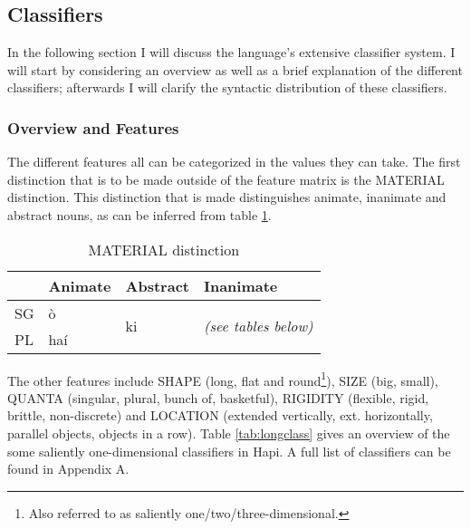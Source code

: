 \documentclass[a4paper, 12pt, oneside]{memoir}
\begin{document}
\subsection{Classifiers}\label{sclassifier}
In the following section I will discuss the language's extensive classifier system. I will start by considering an overview as well as a brief explanation of the different classifiers; afterwards I will clarify the syntactic distribution of these classifiers. 
\subsubsection{Overview and Features}
The different features all can be categorized in the values they can take. The first distinction that is to be made outside of the feature matrix is the MATERIAL distinction. This distinction that is made distinguishes animate, inanimate and abstract nouns, as can be inferred from table \ref{t:clmaterial}.
\begin{table}[H]
\begin{centering}
\begin{tabular}{@{}llll@{}}
\toprule
   & Animate & Abstract            & Inanimate                           \\ \midrule
SG & ò      & \multirow{2}{*}{ki} & \multirow{2}{*}{\textit{(see tables below)}} \\
PL & haí     &                     &                                     \\ \bottomrule
\end{tabular}
\caption{MATERIAL distinction}
\label{t:clmaterial}
\end{centering}
\end{table}

The other features include SHAPE (long, flat and round\footnote{Also referred to as saliently one/two/three-dimensional.}), SIZE (big, small), QUANTA (singular, plural, bunch of, basketful), RIGIDITY (flexible, rigid, brittle, non-discrete) and LOCATION (extended vertically, ext. horizontally, parallel objects, objects in a row). Table \ref{tab:longclass} gives an overview of the some saliently one-dimensional classifiers in Hapi. A full list of classifiers can be found in Appendix A.
\end{document}
